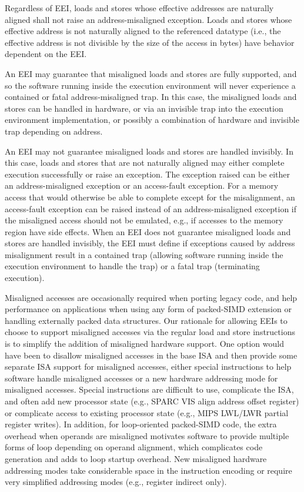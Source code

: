 Regardless of EEI, loads and stores whose effective addresses are
naturally aligned shall not raise an address-misaligned exception.
Loads and stores whose effective address is not naturally aligned
to the referenced datatype (i.e., the effective address is
not divisible by the size of the access in bytes) have behavior
dependent on the EEI.

An EEI may guarantee that misaligned loads and stores are fully
supported, and so the software running inside the execution
environment will never experience a contained or fatal
address-misaligned trap.  In this case, the misaligned loads and
stores can be handled in hardware, or via an invisible trap into the
execution environment implementation, or possibly a combination of
hardware and invisible trap depending on address.

An EEI may not guarantee misaligned loads and stores are handled
invisibly.  In this case, loads and stores that are not naturally
aligned may either complete execution successfully or raise an
exception.  The exception raised can be either an address-misaligned
exception or an access-fault exception.  For a memory access that would
otherwise be able to complete except for the misalignment, an
access-fault exception can be raised instead of an address-misaligned
exception if the misaligned access should not be emulated, e.g., if
accesses to the memory region have side effects.  When an EEI does not
guarantee misaligned loads and stores are handled invisibly, the EEI
must define if exceptions caused by address misalignment result in a
contained trap (allowing software running inside the execution
environment to handle the trap) or a fatal trap (terminating
execution).

\begin{commentary}
Misaligned accesses are occasionally required when porting legacy
code, and help performance on applications when using any form of
packed-SIMD extension or handling externally packed data structures.
Our rationale for allowing EEIs to choose to support misaligned
accesses via the regular load and store instructions is to simplify
the addition of misaligned hardware support.  One option would have
been to disallow misaligned accesses in the base ISA and then provide
some separate ISA support for misaligned accesses, either special
instructions to help software handle misaligned accesses or a new
hardware addressing mode for misaligned accesses.  Special
instructions are difficult to use, complicate the ISA, and often add
new processor state (e.g., SPARC VIS align address offset register) or
complicate access to existing processor state (e.g., MIPS LWL/LWR
partial register writes).  In addition, for loop-oriented packed-SIMD
code, the extra overhead when operands are misaligned motivates
software to provide multiple forms of loop depending on operand
alignment, which complicates code generation and adds to loop startup
overhead.  New misaligned hardware addressing modes take considerable
space in the instruction encoding or require very simplified
addressing modes (e.g., register indirect only).
\end{commentary}

